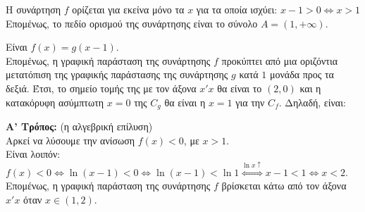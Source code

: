 \begin{alist}
\item Η συνάρτηση $f$ ορίζεται για εκείνα μόνο τα $x$ για τα οποία ισχύει: $x - 1 > 0 \Leftrightarrow x > 1$ \\
Επομένως, το πεδίο ορισμού της συνάρτησης είναι το σύνολο $A = (1, +\infty)$.
\item Είναι $f(x) = g(x-1)$. \\
Επομένως, η γραφική παράσταση της συνάρτησης $f$ προκύπτει από μια οριζόντια μετατόπιση της γραφικής παράστασης της συνάρτησης $g$ κατά $1$ μονάδα προς τα δεξιά. Έτσι, το σημείο τομής της με τον άξονα $x'x$ θα είναι το $(2,0)$ και η κατακόρυφη ασύμπτωτη $x=0$ της $C_g$ θα είναι η $x=1$ για την $C_f$. Δηλαδή, είναι:
\begin{center}
\end{center}
\item \textbf{Α' Τρόπος:} (η αλγεβρική επίλυση) \\
Αρκεί να λύσουμε την ανίσωση $f(x) < 0$, με $x > 1$. \\
Είναι λοιπόν: $f(x) < 0 \Leftrightarrow \ln(x-1) < 0 \Leftrightarrow \ln(x-1) < \ln 1 \overset{\ln x \uparrow}{\Longleftrightarrow} x-1 < 1 \Leftrightarrow x < 2$. \\
Επομένως, η γραφική παράσταση της συνάρτησης $f$ βρίσκεται κάτω από τον άξονα $x'x$ όταν $x \in (1,2)$.
\end{alist}

